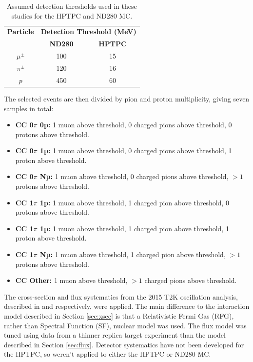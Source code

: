 \begin{center}
\begin{table}
\center
\begin{tabular}{c ||c c}
\hline \hline
\textbf{Particle} & \multicolumn{2}{c}{\textbf{Detection Threshold (MeV)}}\\
 & \textbf{ND280} & \textbf{HPTPC} \\
 \hline \hline
$\mu^{\pm}$ & 100 & 15 \\
$\pi^{\pm}$ & 120 & 16 \\
$p$ & 450 & 60 \\
\hline \hline
\end{tabular}
\caption{Assumed detection thresholds used in these studies for the HPTPC and ND280 MC.}
\label{tab:hptpcthresh}
\end{table}
\end{center}

The selected events are then divided by pion and proton multiplicity, giving seven samples in total:

\begin{itemize}

\item \textbf{CC 0$\pi$ 0p:} 1 muon above threshold, 0 charged pions above threshold, 0 protons above threshold.

\item \textbf{CC 0$\pi$ 1p:} 1 muon above threshold, 0 charged pions above threshold, 1 proton above threshold.

\item \textbf{CC 0$\pi$ Np:} 1 muon above threshold, 0 charged pions above threshold, $>1$ protons above threshold.

\item \textbf{CC 1$\pi$ 1p:} 1 muon above threshold, 1 charged pion above threshold, 0 protons above threshold.

\item \textbf{CC 1$\pi$ 1p:} 1 muon above threshold, 1 charged pion above threshold, 1 proton above threshold.

\item \textbf{CC 1$\pi$ Np:} 1 muon above threshold, 1 charged pion above threshold, $>1$ protons above threshold.

\item \textbf{CC Other:} 1 muon above threshold, $>1$ charged pions above threshold.

\end{itemize}

The cross-section and flux systematics from the 2015 T2K oscillation analysis, described in \cite{tn265} and \cite{tn217} respectively, were applied. The main difference to the interaction model described in Section \ref{sec:xsec} is that a Relativistic Fermi Gas (RFG), rather than Spectral Function (SF), nuclear model was used. The flux model was tuned using data from a thinner replica target experiment than the model described in Section \ref{sec:flux}. Detector systematics have not been developed for the HPTPC, so weren't applied to either the HPTPC or ND280 MC.

